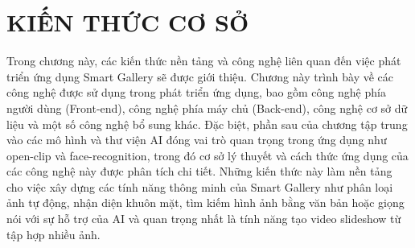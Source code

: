 \chapter{KIẾN THỨC CƠ SỞ}
Trong chương này, các kiến thức nền tảng và công nghệ liên quan đến việc phát triển ứng dụng Smart Gallery sẽ được giới thiệu. Chương này trình bày về các công nghệ được sử dụng trong phát triển ứng dụng, bao gồm công nghệ phía người dùng (Front-end), công nghệ phía máy chủ (Back-end), công nghệ cơ sở dữ liệu và một số công nghệ bổ sung khác. Đặc biệt, phần sau của chương tập trung vào các mô hình và thư viện AI đóng vai trò quan trọng trong ứng dụng như open-clip và face-recognition, trong đó cơ sở lý thuyết và cách thức ứng dụng của các công nghệ này được phân tích chi tiết. Những kiến thức này làm nền tảng cho việc xây dựng các tính năng thông minh của Smart Gallery như phân loại ảnh tự động, nhận diện khuôn mặt, tìm kiếm hình ảnh bằng văn bản hoặc giọng nói với sự hỗ trợ của AI và quan trọng nhất là tính năng tạo video slideshow từ tập hợp nhiều ảnh.














